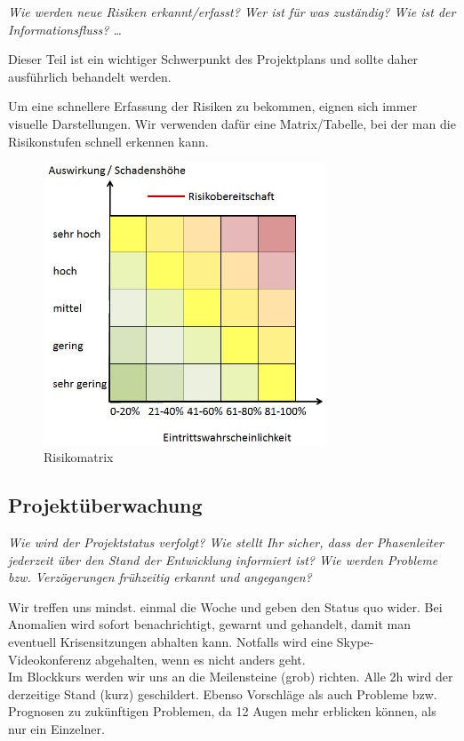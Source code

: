 \documentclass[fontsize=12pt,paper=a4,twoside]{scrartcl}
\begin{document}
{\em Wie werden neue Risiken erkannt/erfasst? Wer ist für was
  zuständig? Wie ist der Informationsfluss? \ldots 

Dieser Teil ist ein
  wichtiger Schwerpunkt des Projektplans und sollte daher ausführlich
  behandelt werden.}

Um eine schnellere Erfassung der Risiken zu bekommen, eignen sich immer visuelle Darstellungen. Wir verwenden dafür eine Matrix/Tabelle, bei der man die Risikonstufen schnell erkennen kann.\\

\begin{figure}[H]
	\centering
	\includegraphics[width=0.75\textwidth]{src/risikomatrix.png}
	\caption{Risikomatrix}
	\label{fig:Matrixtable}
\end{figure}



\subsection{Projektüberwachung}\label{3.4-controlling}
{\em Wie wird der Projektstatus verfolgt? Wie stellt Ihr sicher, dass
  der Phasenleiter jederzeit über den Stand der Entwicklung informiert
  ist? Wie werden Probleme bzw. Verzögerungen frühzeitig erkannt und
  angegangen?}

Wir treffen uns mindst. einmal die Woche und geben den Status quo wider. Bei Anomalien wird sofort benachrichtigt, gewarnt und gehandelt, damit man eventuell Krisensitzungen abhalten kann. Notfalls wird eine Skype-Videokonferenz abgehalten, wenn es nicht anders geht.\\
Im Blockkurs werden wir uns an die Meilensteine (grob) richten. Alle 2h wird der derzeitige Stand (kurz) geschildert. Ebenso Vorschläge als auch Probleme bzw. Prognosen zu zukünftigen Problemen, da 12 Augen mehr erblicken können, als nur ein Einzelner.\\ 
\end{document}
